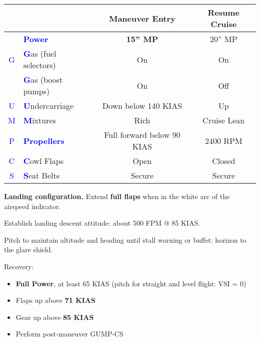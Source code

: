 \begin{table}[H]
\centering
\begin{tabular}{|c|l|c|c|}
\hline
                    &                                                 & \textbf{Maneuver Entry} & \textbf{Resume Cruise} \\ \hline
                    & \textcolor{blue}{\textbf{Power}}                & \textbf{15'' MP}        & 20'' MP                \\ \hline
\textcolor{blue}{G} & \textcolor{blue}{\textbf{G}}as (fuel selectors) & On                      & On                     \\
                    & \textcolor{blue}{\textbf{G}}as (boost pumps)    & On                      & Off                    \\ \hline
\textcolor{blue}{U} & \textcolor{blue}{\textbf{U}}ndercarriage        & Down below 140 KIAS     & Up                     \\ \hline
\textcolor{blue}{M} & \textcolor{blue}{\textbf{M}}ixtures             & Rich                    & Cruise Lean            \\ \hline
\textcolor{blue}{P} & \textcolor{blue}{\textbf{Propellers}}           & Full forward below 90 KIAS & 2400 RPM            \\ \hline
\textcolor{blue}{C} & \textcolor{blue}{\textbf{C}}owl Flaps           & Open                    & Closed                 \\ \hline
\textcolor{blue}{S} & \textcolor{blue}{\textbf{S}}eat Belts           & Secure                  & Secure                 \\ \hline
\end{tabular}
\end{table}

\textbf{Landing configuration.} Extend \textbf{full flaps} when in the white arc of the airspeed indicator.

Establish landing descent attitude: about 500 FPM @ 85 KIAS.

Pitch to maintain altitude and heading until stall warning or buffet: horizon to the glare shield.

Recovery:
\begin{itemize}[label={}]
\item \textbf{Full Power}, at least 65 KIAS (pitch for straight and level flight: VSI = 0)
\item Flaps up above \textbf{71 KIAS}
\item Gear up above \textbf{85 KIAS}
\item Perform post-maneuver GUMP-CS
\end{itemize}

